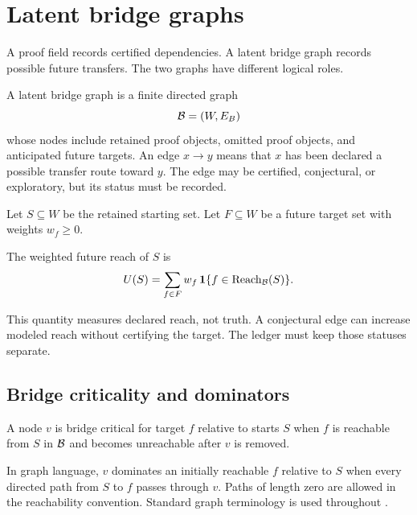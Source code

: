 \section{Latent bridge graphs}
\label{PPT:sec:old13}

A proof field records certified dependencies. A latent bridge graph records possible future transfers. The two graphs have different logical roles.

\begin{PPTdefinition}
\label{PPT:res:13:1}
A latent bridge graph is a finite directed graph
\[
\mathcal B=(W,E_B)
\]
whose nodes include retained proof objects, omitted proof objects, and anticipated future targets. An edge $x\to y$ means that $x$ has been declared a possible transfer route toward $y$. The edge may be certified, conjectural, or exploratory, but its status must be recorded.
\end{PPTdefinition}

Let $S\subseteq W$ be the retained starting set. Let $F\subseteq W$ be a future target set with weights $w_f\ge0$.

\begin{PPTdefinition}
\label{PPT:res:13:2}
The weighted future reach of $S$ is
\[
U(S)=\sum_{f\in F}w_f\,
\mathbf 1\{f\in\operatorname{Reach}_{\mathcal B}(S)\}.
\]
\end{PPTdefinition}

This quantity measures declared reach, not truth. A conjectural edge can increase modeled reach without certifying the target. The ledger must keep those statuses separate.

\subsection{Bridge criticality and dominators}

\begin{PPTdefinition}
\label{PPT:res:13:3}
A node $v$ is bridge critical for target $f$ relative to starts $S$ when $f$ is reachable from $S$ in $\mathcal B$ and becomes unreachable after $v$ is removed.
\end{PPTdefinition}

In graph language, $v$ dominates an initially reachable $f$ relative to $S$ when every directed path from $S$ to $f$ passes through $v$. Paths of length zero are allowed in the reachability convention. Standard graph terminology is used throughout \cite{PPT:diestel}.

